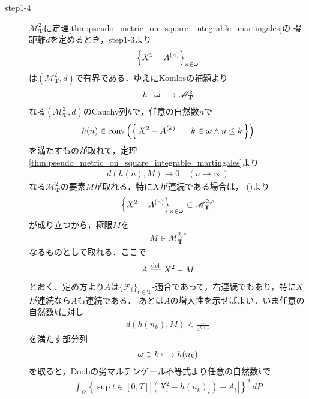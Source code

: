 \begin{sketch}
\begin{description}
			\item[step1-4]
				$\mathscr{M}^2_{\mathbf{T}}$に定理\ref{thm:pseudo_metric_on_square_integrable_martingales}の
				擬距離$d$を定めるとき，step1-3より
				\begin{align}
					\left\{X^2 - A^{(n)}\right\}_{n \in {\boldsymbol \omega}}
				\end{align}
				は$\left(\mathscr{M}^2_{\mathbf{T}},d\right)$で有界である．ゆえにKomlosの補題より
				\begin{align}
					h:{\boldsymbol \omega} \longrightarrow \mathscr{M}^2_{\mathbf{T}}
				\end{align}
				なる$\left(\mathscr{M}^2_{\mathbf{T}},d\right)$のCauchy列$h$で，任意の自然数$n$で
				\begin{align}
					h(n) \in \operatorname*{conv} \left(\left\{\, X^2-A^{(k)} \mid \quad k \in {\boldsymbol \omega} \wedge n \leq k\, \right\}\right)
					\label{fom:thm_decomposition_of_local_martingales_3}
				\end{align}
				を満たすものが取れて，定理\ref{thm:pseudo_metric_on_square_integrable_martingales}より
				\begin{align}
					d(h(n),M) \longrightarrow 0\quad (n \longrightarrow \infty)
				\end{align}
				なる$\mathscr{M}^2_{\mathbf{T}}$の要素$M$が取れる．特に$X$が連続である場合は，
				()より
				\begin{align}
					\left\{X^2 - A^{(n)}\right\}_{n \in {\boldsymbol \omega}} \subset \mathscr{M}^{2,c}_{\mathbf{T}}
				\end{align}
				が成り立つから，極限$M$を
				\begin{align}
					M \in \mathscr{M}^{2,c}_{\mathbf{T}}
				\end{align}
				なるものとして取れる．ここで
				\begin{align}
					A \defeq X^2 - M
				\end{align}
				とおく．定め方より$A$は$\{\mathscr{F}_t\}_{t \in \mathbf{T}}$-適合であって，右連続でもあり，特に$X$が連続なら$A$も連続である．
				あとは$A$の増大性を示せばよい．いま任意の自然数$k$に対し
				\begin{align}
					d(h(n_k),M) < \frac{1}{4^{k+1}}
				\end{align}
				を満たす部分列
				\begin{align}
					{\boldsymbol \omega} \ni k \longmapsto h(n_k)
				\end{align}
				を取ると，Doobの劣マルチンゲール不等式より任意の自然数$k$で
				\begin{align}
					\int_\Omega \left\{\sup{t \in [0,T]}{\left|\left(X^2_t - h(n_k)_t\right) - A_t\right|}\right\}^2\ dP

\end{align}
\end{description}
\end{sketch}
